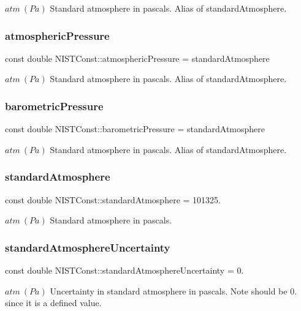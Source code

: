 $atm \ (Pa)$ Standard atmosphere in pascals. Alias of standard\+Atmosphere. \mbox{\label{group___standard_atmosphere_gab92a3a9d0d82fc926390602e825afea5}} 
\subsubsection{\texorpdfstring{atmospheric\+Pressure}{atmosphericPressure}}
{\footnotesize\ttfamily const double N\+I\+S\+T\+Const\+::atmospheric\+Pressure = standard\+Atmosphere}

$atm \ (Pa)$ Standard atmosphere in pascals. Alias of standard\+Atmosphere. \mbox{\label{group___standard_atmosphere_ga09e2a2bce1e1f38985f98c22d5a8d43d}} 
\subsubsection{\texorpdfstring{barometric\+Pressure}{barometricPressure}}
{\footnotesize\ttfamily const double N\+I\+S\+T\+Const\+::barometric\+Pressure = standard\+Atmosphere}

$atm \ (Pa)$ Standard atmosphere in pascals. Alias of standard\+Atmosphere. \mbox{\label{group___standard_atmosphere_ga260e00232ff2d0d8a24bdbf7f6c87b4e}} 
\subsubsection{\texorpdfstring{standard\+Atmosphere}{standardAtmosphere}}
{\footnotesize\ttfamily const double N\+I\+S\+T\+Const\+::standard\+Atmosphere = 101325.}

$atm \ (Pa)$ Standard atmosphere in pascals. \mbox{\label{group___standard_atmosphere_ga784dc63051d7f1dca50f4f2843c8fbcf}} 
\subsubsection{\texorpdfstring{standard\+Atmosphere\+Uncertainty}{standardAtmosphereUncertainty}}
{\footnotesize\ttfamily const double N\+I\+S\+T\+Const\+::standard\+Atmosphere\+Uncertainty = 0.}

$atm \ (Pa)$ Uncertainty in standard atmosphere in pascals. Note should be 0. since it is a defined value. 